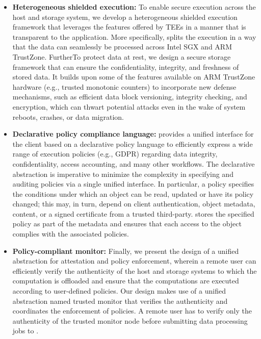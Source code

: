 \begin{itemize}
\item {\bf Heterogeneous shielded execution:} To enable secure execution across the host and storage system, we develop a heterogeneous shielded execution framework that leverages the features offered by TEEs in a manner that is transparent to the application. More specifically, \project{} 
splits the execution in a way that the data can seamlessly be processed across Intel SGX and ARM TrustZone. FurtherTo protect data at rest, we design a secure storage framework that can ensure the confidentiality, integrity, and freshness of stored data. It builds upon some of the features available on ARM TrustZone hardware (e.g., trusted monotonic counters) to incorporate new defense mechanisms, such as efficient data block versioning, integrity checking, and encryption, which can thwart potential attacks even in the wake of system reboots, crashes, or data migration.

\item {\bf Declarative policy compliance language:} \project provides a unified interface for the client based on a declarative policy language to efficiently express a wide range of execution policies (e.g., GDPR) regarding data integrity, confidentiality, access accounting, and many
other workflows. The declarative abstraction is imperative to
minimize the complexity in specifying and auditing policies
via a single unified interface. In particular, a policy specifies
the conditions under which an object can be read, updated or
have its policy changed; this may, in turn, depend on client authentication, object metadata, content, or a signed certificate from a trusted third-party. \project stores the specified policy as part of the metadata and ensures that each access to the object complies with the associated policies.

\item {\bf Policy-compliant monitor:} Finally, we present the design of a unified abstraction for attestation and policy enforcement, wherein a remote user can efficiently verify the authenticity of the host and storage systems to which the computation is offloaded and ensure that the computations are executed according to user-defined policies. Our design makes use of a unified abstraction named trusted monitor that verifies the authenticity and coordinates the enforcement of policies. A remote user has to verify only the authenticity of the trusted monitor node before submitting data processing jobs to \project.
\end{itemize}

